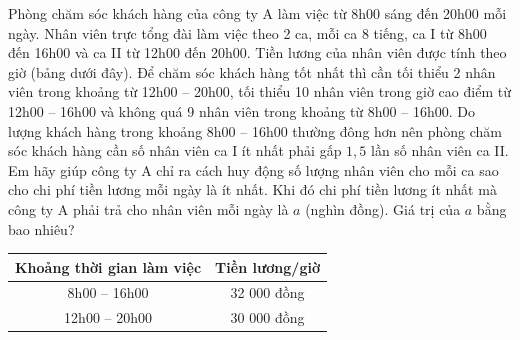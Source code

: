 \begin{ex}
Phòng chăm sóc khách hàng của công ty A làm việc từ 8h00 sáng đến 20h00 mỗi ngày. Nhân viên trực tổng đài làm việc theo 2 ca, mỗi ca 8 tiếng, ca I từ 8h00 đến 16h00 và ca II từ 12h00 đến 20h00. Tiền lương của nhân viên được tính theo giờ (bảng dưới đây). Để chăm sóc khách hàng tốt nhất thì cần tối thiểu 2 nhân viên trong khoảng từ 12h00 -- 20h00, tối thiểu 10 nhân viên trong giờ cao điểm từ 12h00 -- 16h00 và không quá 9 nhân viên trong khoảng từ 8h00 -- 16h00. Do lượng khách hàng trong khoảng 8h00 -- 16h00 thường đông hơn nên phòng chăm sóc khách hàng cần số nhân viên ca I ít nhất phải gấp $1{,}5$ lần số nhân viên ca II. Em hãy giúp công ty A chỉ ra cách huy động số lượng nhân viên cho mỗi ca sao cho chi phí tiền lương mỗi ngày là ít nhất. Khi đó chi phí tiền lương ít nhất mà công ty A phải trả cho nhân viên mỗi ngày là ${{a}}$ (nghìn đồng). Giá trị của ${{a}}$ bằng bao nhiêu?

\begin{center}
\begin{tabular}{|c|c|}
            \hline
            \textbf{Khoảng thời gian làm việc} & \textbf{Tiền lương/giờ} \\            \hline
            8h00 -- 16h00 & 32 000 đồng \\
            \hline
            12h00 -- 20h00 & 30 000 đồng \\
            \hline
        \end{tabular}

\end{center}

\end{ex}

